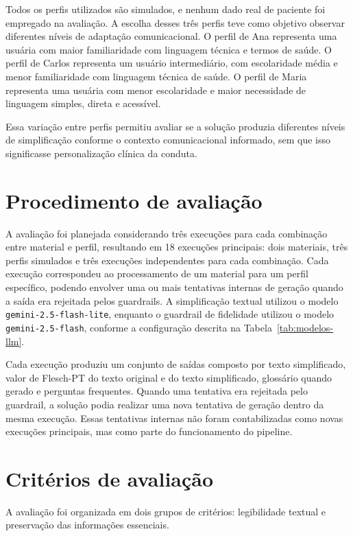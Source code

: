 Todos os perfis utilizados são simulados, e nenhum dado real de paciente foi empregado na avaliação. A escolha desses três perfis teve como objetivo observar diferentes níveis de adaptação comunicacional. O perfil de Ana representa uma usuária com maior familiaridade com linguagem técnica e termos de saúde. O perfil de Carlos representa um usuário intermediário, com escolaridade média e menor familiaridade com linguagem técnica de saúde. O perfil de Maria representa uma usuária com menor escolaridade e maior necessidade de linguagem simples, direta e acessível.

Essa variação entre perfis permitiu avaliar se a solução produzia diferentes níveis de simplificação conforme o contexto comunicacional informado, sem que isso significasse personalização clínica da conduta.

\section{Procedimento de avaliação}
\label{sec:procedimento-avaliacao}

A avaliação foi planejada considerando três execuções para cada combinação entre material e perfil, resultando em 18 execuções principais: dois materiais, três perfis simulados e três execuções independentes para cada combinação. Cada execução correspondeu ao processamento de um material para um perfil específico, podendo envolver uma ou mais tentativas internas de geração quando a saída era rejeitada pelos guardrails. A simplificação textual utilizou o modelo \texttt{gemini-2.5-flash-lite}, enquanto o guardrail de fidelidade utilizou o modelo \texttt{gemini-2.5-flash}, conforme a configuração descrita na Tabela~\ref{tab:modelos-llm}.

Cada execução produziu um conjunto de saídas composto por texto simplificado, valor de Flesch-PT do texto original e do texto simplificado, glossário quando gerado e perguntas frequentes. Quando uma tentativa era rejeitada pelo guardrail, a solução podia realizar uma nova tentativa de geração dentro da mesma execução. Essas tentativas internas não foram contabilizadas como novas execuções principais, mas como parte do funcionamento do pipeline.

\section{Critérios de avaliação}
\label{sec:criterios-avaliacao}

A avaliação foi organizada em dois grupos de critérios: legibilidade textual e preservação das informações essenciais.

